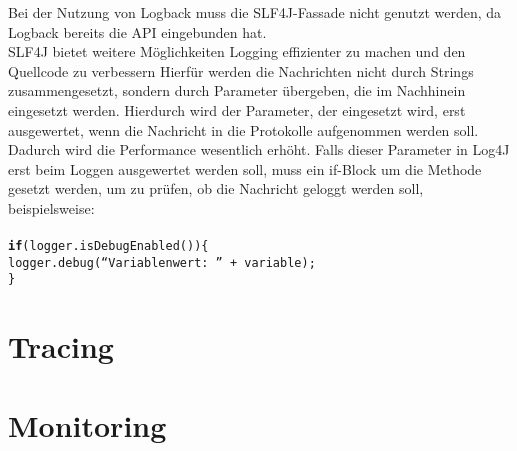 {    Bei der Nutzung von Logback muss die SLF4J-Fassade nicht genutzt werden, da Logback bereits die API eingebunden hat.
    \\
    SLF4J bietet weitere Möglichkeiten Logging effizienter zu machen und den Quellcode zu verbessern
    Hierfür werden die Nachrichten nicht durch Strings zusammengesetzt, sondern durch Parameter übergeben, die im Nachhinein eingesetzt werden.
    Hierdurch wird der Parameter, der eingesetzt wird, erst ausgewertet, wenn die Nachricht in die Protokolle aufgenommen werden soll.
    Dadurch wird die Performance wesentlich erhöht.
    Falls dieser Parameter in Log4J erst beim Loggen ausgewertet werden soll, muss ein if-Block um die Methode gesetzt werden, um zu prüfen, ob die Nachricht geloggt werden soll, beispielsweise:
    \\
    \\
    \hspace*{10mm}
    \texttt{\textbf{if}(logger.isDebugEnabled())\{
    \\
    \hspace*{15mm}
    logger.debug(\enquote{Variablenwert: } + variable);
    \\
    \hspace*{10mm}
    \}
    }
}\autocite{baeldung, rheinwerk}

%


\section{Tracing}\label{sec:tracing-verfahren}



\section{Monitoring}\label{sec:monitoring-verfahren}




